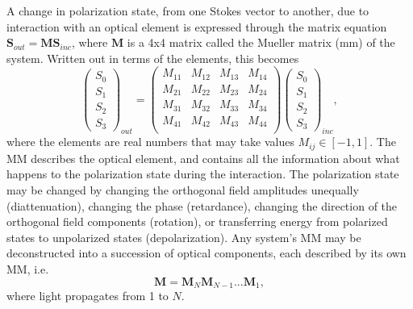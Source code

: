 A change in polarization state, from one Stokes vector to another, due to interaction with an optical element is expressed through the matrix equation $\mathbf{S}_{out} = \mathbf{M}\mathbf{S}_{inc}$, where $\mathbf{M}$ is a 4x4 matrix called the Mueller matrix (\ac{mm}) of the system. Written out in terms of the elements, this becomes
\begin{equation}
    \begin{pmatrix}
        S_0 \\
        S_1 \\
        S_2 \\
        S_3
    \end{pmatrix}_{out}
    =
    \begin{pmatrix}
    M_{11} & M_{12} & M_{13} & M_{14}   \\
    M_{21} & M_{22} & M_{23} & M_{24}   \\
    M_{31} & M_{32} & M_{33} & M_{34}   \\
    M_{41} & M_{42} & M_{43} & M_{44}   \\
    \end{pmatrix}
    \begin{pmatrix}
        S_0 \\
        S_1 \\
        S_2 \\
        S_3
    \end{pmatrix}_{inc},
\end{equation}
where the elements are real numbers that may take values $M_{ij}\in[-1,1]$. The MM describes the optical element, and contains all the information about what happens to the polarization state during the interaction. The polarization state may be changed by changing the orthogonal field amplitudes unequally (diattenuation), changing the phase (retardance), changing the direction of the orthogonal field components (rotation), or transferring energy from polarized states to unpolarized states (depolarization). Any system's MM may be deconstructed into a succession of optical components, each described by its own MM, i.e.\cite{hans_arwin}
\begin{equation}
    \mathbf{M} = \mathbf{M}_N \mathbf{M}_{N-1}...\mathbf{M}_1, 
\end{equation}
where light propagates from 1 to $N$.

